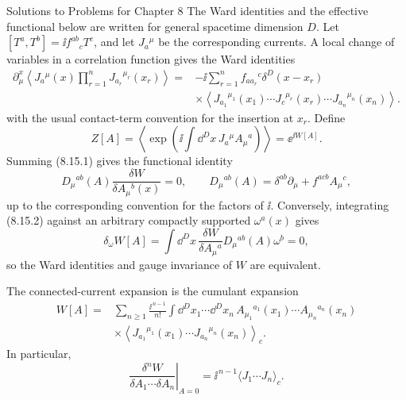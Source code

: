 \begin{bankssolutions}{Solutions to Problems for Chapter 8}
The Ward identities and the effective functional below are written for general
spacetime dimension $D$.
Let $[T^a,T^b]=\ii f^{ab}{}_cT^c$, and let $J_a{}^\mu$ be the corresponding
currents.  A local change of variables in a correlation function gives the
Ward identities
\begin{equation}
\begin{aligned}
  \partial_\mu^x\left\langle J_a{}^\mu(x)
  \prod_{r=1}^nJ_{a_r}{}^{\mu_r}(x_r)\right\rangle
  ={}&-\ii\sum_{r=1}^n f_{a a_r}{}^c\delta^D(x-x_r)\\
  &\times\left\langle J_{a_1}{}^{\mu_1}(x_1)\cdots
  J_c{}^{\mu_r}(x_r)\cdots J_{a_n}{}^{\mu_n}(x_n)\right\rangle .
\end{aligned}
\tag{8.15.1}
\end{equation}
with the usual contact-term convention for the insertion at $x_r$.  Define
\[
  Z[A]=\left\langle\exp\!\left(\ii\int\dd^D x\,
  J_a{}^\mu A_\mu{}^a\right)\right\rangle=\ee^{\ii W[A]}.
\]
Summing (8.15.1) gives the functional identity
\[
  D_\mu{}^{ab}(A)\frac{\delta W}{\delta A_\mu{}^b(x)}=0,
  \qquad
  D_\mu{}^{ab}(A)=\delta^{ab}\partial_\mu+f^{acb}A_\mu{}^c,
  \tag{8.15.2}
\]
up to the corresponding convention for the factors of $\ii$.  Conversely,
integrating (8.15.2) against an arbitrary compactly supported
$\omega^a(x)$ gives
\[
  \delta_\omega W[A]=\int\dd^D x\,
  \frac{\delta W}{\delta A_\mu{}^a}D_\mu{}^{ab}(A)\omega^b=0,
  \tag{8.15.3}
\]
so the Ward identities and gauge invariance of $W$ are equivalent.

The connected-current expansion is the cumulant expansion
\[
\begin{aligned}
  W[A]={}&\sum_{n\geq1}\frac{\ii^{\,n-1}}{n!}
  \int\!\dd^D x_1\cdots\dd^D x_n\,
  A_{\mu_1}{}^{a_1}(x_1)\cdots A_{\mu_n}{}^{a_n}(x_n)\\
  &\times\left\langle J_{a_1}{}^{\mu_1}(x_1)\cdots
  J_{a_n}{}^{\mu_n}(x_n)\right\rangle_{\!c} .
\end{aligned}
\tag{8.15.4}
\]
In particular,
\[
  \left.\frac{\delta^nW}{\delta A_1\cdots\delta A_n}\right|_{A=0}
  =\ii^{\,n-1}\langle J_1\cdots J_n\rangle_c.
  \tag{8.15.5}
\]


\end{bankssolutions}

